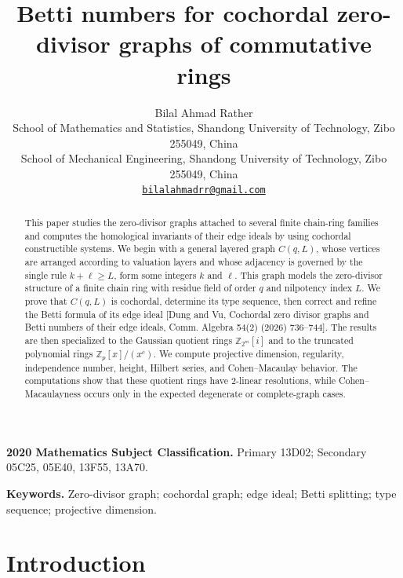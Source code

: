 \documentclass[12pt]{article}
\title{Betti numbers for cochordal zero-divisor graphs of commutative rings}
\author{Bilal Ahmad Rather\\[2mm]
        \small School of Mathematics and Statistics, Shandong University of Technology, Zibo 255049, China\\
        \small School of Mechanical Engineering, Shandong University of Technology, Zibo 255049, China\\
        \texttt{\href{mailto:bilalahmadrr@gmail.com}{bilalahmadrr@gmail.com}}
			}
\date{}
\theoremstyle{definition}
\begin{document}
\maketitle

\begin{abstract}
	This paper studies the zero-divisor graphs attached to several finite chain-ring families and computes the homological invariants of their edge ideals by using cochordal constructible systems.  We begin with a general layered graph $C(q,L)$, whose vertices are arranged according to valuation layers and whose adjacency is governed by the single rule $k+\ell\ge L$, form some integers $k$ and $\ell$.  This graph models the zero-divisor structure of a finite chain ring with residue field of order $q$ and nilpotency index $L$.  We prove that $C(q,L)$ is cochordal, determine its type sequence, then correct and refine the Betti formula of its edge ideal [Dung and Vu, Cochordal zero divisor graphs and Betti numbers of their edge ideals, Comm. Algebra  54(2) (2026) 736--744]. The results are then specialized to the Gaussian quotient rings $\mathbb Z_{2^m}[i]$ and to the truncated polynomial rings $\mathbb Z_p[x]/(x^c)$.  We compute projective dimension, regularity, independence number, height, Hilbert series, and Cohen--Macaulay behavior.  The computations show that these quotient rings have $2$-linear resolutions, while Cohen--Macaulayness occurs only in the expected degenerate or complete-graph cases.
\end{abstract}

\noindent \textbf{2020 Mathematics Subject Classification.} Primary 13D02; Secondary 05C25, 05E40, 13F55, 13A70.

\medskip

\noindent \textbf{Keywords.} Zero-divisor graph; cochordal graph; edge ideal; Betti splitting; type sequence; projective dimension.

\medskip
\tableofcontents
\section{Introduction}\label{sec:introduction}
\end{document}
